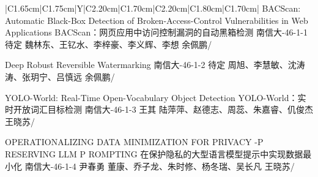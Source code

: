 \Needspace{7.5cm}
\begin{tabularx}{\textwidth}{|C{1.65cm}|C{1.75cm}|Y|C{2.20cm}|C{1.70cm}|C{2.20cm}|C{1.80cm}|C{1.70cm}|}
\HeaderRow
{}
{BACScan: Automatic Black-Box Detection of Broken-Access-Control Vulnerabilities in Web Applications\newline 
BACScan：网页应用中访问控制漏洞的自动黑箱检测}
{南信大-46-1-1}
{待定}
{魏林东、王钇水、李梓豪、李义辉、李想}
{余佩鹏}{/}

{Deep Robust Reversible Watermarking  \newline  }
{南信大-46-1-2}
{待定}
{周旭、李慧敏、沈涛涛、张玥宁、吕慎远}
{余佩鹏}{/}


{YOLO-World: Real-Time Open-Vocabulary Object Detection \newline  
YOLO-World：实时开放词汇目标检测}
{南信大-46-1-3}
{王其}
{陆萍萍、赵德志、周蕊、朱嘉睿、仉俊杰}
{王晓苏}{/}

{OPERATIONALIZING DATA MINIMIZATION FOR PRIVACY -P RESERVING LLM P ROMPTING \newline 在保护隐私的大型语言模型提示中实现数据最小化}
{南信大-46-1-4}
{尹春勇}
{董康、乔子龙、朱时修、杨冬瑞、吴长凡}
{王晓苏}{/}
\end{tabularx}
\BlockGap



